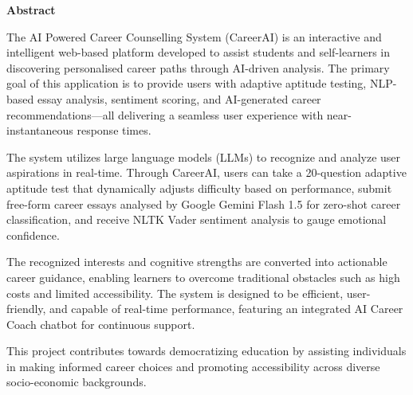 \begin{center}
\LARGE{\textbf{Abstract}}
\end{center}

\linespread{1.33}
\large
The AI Powered Career Counselling System (CareerAI) is an interactive and intelligent web-based platform developed to assist students and self-learners in discovering personalised career paths through AI-driven analysis. The primary goal of this application is to provide users with adaptive aptitude testing, NLP-based essay analysis, sentiment scoring, and AI-generated career recommendations---all delivering a seamless user experience with near-instantaneous response times.

The system utilizes large language models (LLMs) to recognize and analyze user aspirations in real-time. Through CareerAI, users can take a 20-question adaptive aptitude test that dynamically adjusts difficulty based on performance, submit free-form career essays analysed by Google Gemini Flash 1.5 for zero-shot career classification, and receive NLTK Vader sentiment analysis to gauge emotional confidence.

The recognized interests and cognitive strengths are converted into actionable career guidance, enabling learners to overcome traditional obstacles such as high costs and limited accessibility. The system is designed to be efficient, user-friendly, and capable of real-time performance, featuring an integrated AI Career Coach chatbot for continuous support.

This project contributes towards democratizing education by assisting individuals in making informed career choices and promoting accessibility across diverse socio-economic backgrounds.
